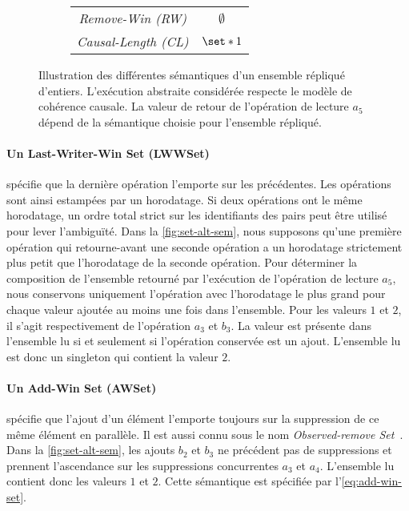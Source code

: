 \begin{figure}[htb]
\begin{subfigure}{\linewidth}
\begin{tabular}{cc}
        \emph{Remove-Win (RW)} & $\emptyset$ \\
        \emph{Causal-Length (CL)} & $\set*{1}$ \\
    \end{tabular}
    \caption{}\label{fig:set-alt-sem-2}
\end{subfigure}
\caption[Sémantiques d'un ensemble répliqué]{Illustration des différentes sémantiques d'un ensemble répliqué d'entiers.
 L'exécution abstraite considérée respecte le modèle de cohérence causale.
 La valeur de retour de l'opération de lecture $a_5$ dépend de la sémantique choisie pour l'ensemble répliqué.
}\label{fig:set-alt-sem}
\end{figure}

\paragraph{Un Last-Writer-Win Set (LWWSet)~\autocite{shapiro2011_comprehensive}} spécifie que la dernière opération l'emporte sur les précédentes. Les opérations sont ainsi estampées par un horodatage.
Si deux opérations ont le même horodatage, un ordre total strict sur les identifiants des pairs peut être utilisé pour lever l'ambiguïté.
Dans la \autoref{fig:set-alt-sem}, nous supposons qu'une première opération qui retourne-avant une seconde opération a un horodatage strictement plus petit que l'horodatage de la seconde opération.
Pour déterminer la composition de l'ensemble retourné par l'exécution de l'opération de lecture $a_5$, nous conservons uniquement l'opération avec l'horodatage le plus grand pour chaque valeur ajoutée au moins une fois dans l'ensemble.
Pour les valeurs $1$ et $2$, il s'agit respectivement de l'opération $a_3$ et $b_3$.
La valeur est présente dans l'ensemble lu si et seulement si l'opération conservée est un ajout.
L'ensemble lu est donc un singleton qui contient la valeur $2$.

\paragraph{Un Add-Win Set (AWSet)~\autocite{shapiro_2011_crdt}} spécifie que l'ajout d'un élément l'emporte toujours sur la suppression de ce même élément en parallèle.
Il est aussi connu sous le nom \emph{Observed-remove Set}~\autocite{shapiro_2011_crdt}.
Dans la \autoref{fig:set-alt-sem}, les ajouts $b_2$ et $b_3$ ne précédent pas de suppressions et prennent l'ascendance sur les suppressions concurrentes $a_3$ et $a_4$.
L'ensemble lu contient donc les valeurs $1$ et $2$.
Cette sémantique est spécifiée par l'\autoref{eq:add-win-set}.

